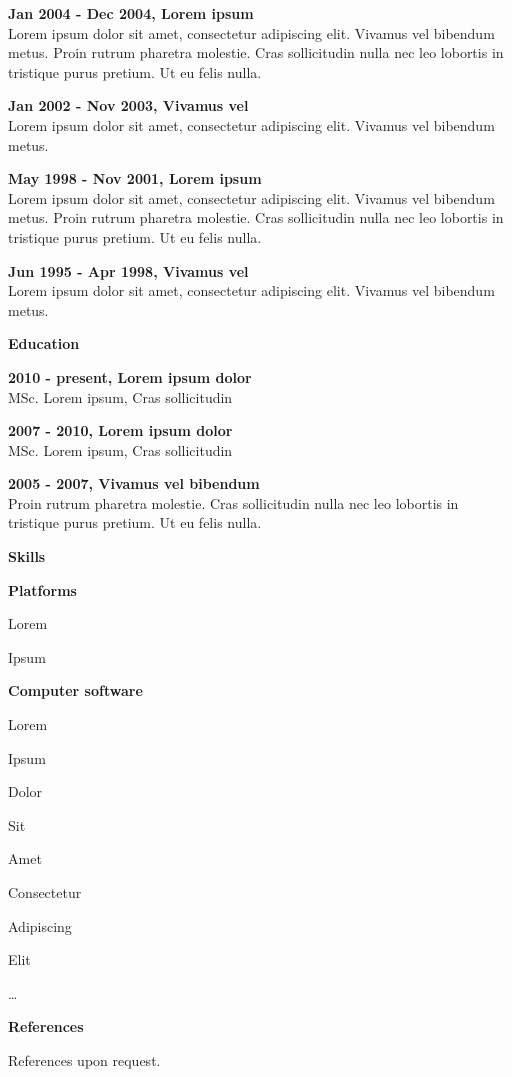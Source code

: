 \documentclass[a4paper,12pt,final]{memoir}
\newcommand{\Sep}{\vspace{1.5em}}
\newcommand{\SmallSep}{\vspace{0.5em}}
\newcommand{\CVSection}[1]
  {\Large\textbf{#1}\par
  \SmallSep\normalsize\normalfont}
\newcommand{\CVItem}[1]
  {\textbf{\color{RoyalBlue} #1}}
\begin{document}
\CVItem{Jan 2004 - Dec 2004, Lorem ipsum}\\
Lorem ipsum dolor sit amet, consectetur adipiscing elit. Vivamus vel bibendum metus. Proin rutrum pharetra molestie. Cras sollicitudin nulla nec leo lobortis in tristique purus pretium. Ut eu felis nulla.
\SmallSep

\CVItem{Jan 2002 - Nov 2003, Vivamus vel}\\
Lorem ipsum dolor sit amet, consectetur adipiscing elit. Vivamus vel bibendum metus.
\SmallSep

\CVItem{May 1998 - Nov 2001, Lorem ipsum}\\
Lorem ipsum dolor sit amet, consectetur adipiscing elit. Vivamus vel bibendum metus. Proin rutrum pharetra molestie. Cras sollicitudin nulla nec leo lobortis in tristique purus pretium. Ut eu felis nulla.
\SmallSep

\CVItem{Jun 1995 - Apr 1998, Vivamus vel}\\
Lorem ipsum dolor sit amet, consectetur adipiscing elit. Vivamus vel bibendum metus.

\Sep

\CVSection{Education}
\CVItem{2010 - present, Lorem ipsum dolor}\\
MSc. Lorem ipsum, Cras sollicitudin
\SmallSep

\CVItem{2007 - 2010, Lorem ipsum dolor}\\
MSc. Lorem ipsum, Cras sollicitudin
\SmallSep

\clearpage
\framebreak
\framebreak

\CVItem{2005 - 2007, Vivamus vel bibendum}\\
Proin rutrum pharetra molestie. Cras sollicitudin nulla nec leo lobortis in tristique purus pretium. Ut eu felis nulla.
\Sep


\CVSection{Skills}
\CVItem{Platforms}
\begin{multicols}{3}
\begin{compactitem}[\color{RoyalBlue}$\circ$]
  \item Lorem 
  \item Ipsum 
\end{compactitem}
\end{multicols}
\SmallSep

\CVItem{Computer software}
\begin{multicols}{3}
\begin{compactitem}[\color{RoyalBlue}$\circ$]
  \item Lorem 
  \item Ipsum 
  \item Dolor 
  \item Sit 
  \item Amet
  \item Consectetur 
  \item Adipiscing 
  \item Elit
  \item \ldots
\end{compactitem}
\end{multicols}
\Sep 

\CVSection{References}
References upon request.

\end{document}
